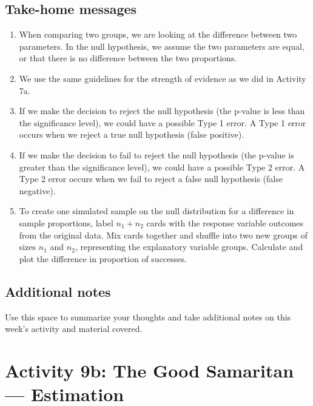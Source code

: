 \documentclass[
]{report}
\begin{document}
\hypertarget{take-home-messages-13}{%
\subsection{Take-home messages}\label{take-home-messages-13}}

\begin{enumerate}
\def\labelenumi{\arabic{enumi}.}
\item
  When comparing two groups, we are looking at the difference between two parameters. In the null hypothesis, we assume the two parameters are equal, or that there is no difference between the two proportions.
\item
  We use the same guidelines for the strength of evidence as we did in Activity 7a.
\item
  If we make the decision to reject the null hypothesis (the p-value is less than the significance level), we could have a possible Type 1 error. A Type 1 error occurs when we reject a true null hypothesis (false positive).
\item
  If we make the decision to fail to reject the null hypothesis (the p-value is greater than the significance level), we could have a possible Type 2 error. A Type 2 error occurs when we fail to reject a false null hypothesis (false negative).
\item
  To create one simulated sample on the null distribution for a difference in sample proportions, label \(n_1 + n_2\) cards with the response variable outcomes from the original data. Mix cards together and shuffle into two new groups of sizes \(n_1\) and \(n_2\), representing the explanatory variable groups. Calculate and plot the difference in proportion of successes.
\end{enumerate}

\hypertarget{additional-notes-10}{%
\subsection{Additional notes}\label{additional-notes-10}}

Use this space to summarize your thoughts and take additional notes on this week's activity and material covered.

\newpage

\hypertarget{activity-9b-the-good-samaritan-estimation}{%
\section{Activity 9b: The Good Samaritan --- Estimation}\label{activity-9b-the-good-samaritan-estimation}}
\end{document}
